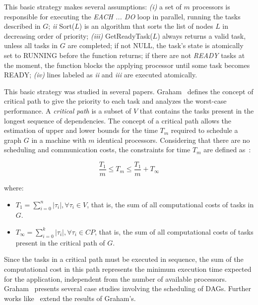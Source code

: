 \documentclass[twocolumn]{svjour3}
\begin{document}
This basic strategy makes several assumptions: \emph{(i)} a set of $m$ processors is responsible for executing the {\color{blue}\emph{EACH ... DO}} loop in parallel, running the tasks described in $G$; \emph{ii} Sort($L$) is an algorithm that sorts the list of {\color{blue}nodes} $L$ in decreasing order of priority; \emph{(iii)} GetReadyTask($L$) always returns a valid task, unless {\color{blue}all tasks in $G$ are completed}; if not NULL, the task's state is atomically set to RUNNING before the function returns; if there are not \emph{READY} tasks at the moment, the function blocks the applying processor until some task becomes READY; \emph{(iv)} lines labeled as \emph{ii} and \emph{iii} are executed atomically. 

This basic strategy was studied in several papers. Graham~\cite{Graham66} defines the concept of {\color{blue}critical path} to give the priority to each task and analyzes the  worst-case performance. A {\color{blue}\emph{critical path}} is a subset of $V$ that contains the tasks present in the longest sequence of {\color{blue}dependencies}. The concept of a critical path allows the estimation of upper and lower bounds for the time $T_m$ required to schedule a graph $G$ in a machine with $m$ identical processors.
Considering that there are no scheduling and communication costs, the constraints for time $T_m$ are defined as~\cite{Graham66}: 

\begin{center}
    \begin{equation}
    \frac{T_1}{m} \le T_m \le \frac{T_1}{m} + T_\infty
    \end{equation}   
\end{center}

\noindent where:
\begin{itemize}
  \item  $T_{1} = \sum_{i=0}^{n} |\tau_{i}| , \forall   \tau_{i} \in V$, that is, the sum of all computational costs of tasks in $G$.
\item $T_{\infty} = \sum_{i=0}^{k} |\tau_{i}| ,  \forall   \tau_{i} \in CP$, that is, the sum of all computational costs of tasks present in the {\color{blue}critical path} of $G$. 
\end{itemize}

Since the tasks in a {\color{blue}critical path} must be executed in sequence, the sum of the computational cost in this path represents the minimum execution time expected for the application, independent from the number of available processors. Graham~\cite{Graham76}  presents several case studies involving the scheduling of DAGs. Further works like~\cite{bartal95,karger96,Albers99,Fleischer2000} extend the results of Graham's.
\end{document}
